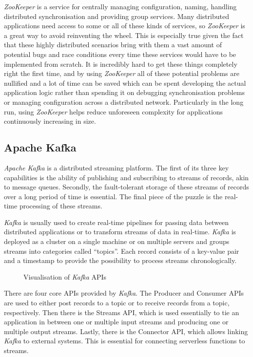 \textit{ZooKeeper} is a service for centrally managing configuration, naming, handling distributed
synchronisation and providing group services. Many distributed applications need access to some or
all of these kinds of services, so \textit{ZooKeeper} is a great way to avoid reinventing the wheel.
This is especially true given the fact that these highly distributed scenarios bring with them a
vast amount of potential bugs and race conditions every time these services would have to be
implemented from scratch. It is incredibly hard to get these things completely right the first time,
and by using \textit{ZooKeeper} all of these potential problems are nullified and a lot of time can
be saved which can be spent developing the actual application logic rather than spending it on
debugging synchronisation problems or managing configuration across a distributed network.
Particularly in the long run, using \textit{ZooKeeper} helps reduce unforeseen complexity for
applications continuously increasing in size.
\cite{zookeeper-homepage}

\subsection{Apache Kafka}

\textit{Apache Kafka} is a distributed streaming platform. The first of its three key capabilities
is the ability of publishing and subscribing to streams of records, akin to message queues.
Secondly, the fault-tolerant storage of these streams of records over a long period of time is
essential. The final piece of the puzzle is the real-time processing of these streams.

\textit{Kafka} is usually used to create real-time pipelines for passing data between distributed
applications or to transform streams of data in real-time. \textit{Kafka} is deployed as a cluster
on a single machine or on multiple servers and groups streams into categories called “topics”. Each
record consists of a key-value pair and a timestamp to provide the possibility to process streams
chronologically.

\begin{figure}[H]
  \centering
  \caption{Visualisation of \textit{Kafka} APIs \cite{kafka-complete-introduction}}
\end{figure}

There are four core APIs provided by \textit{Kafka}. The Producer and Consumer APIs are used to
either post records to a topic or to receive records from a topic, respectively. Then there is the
Streams API, which is used essentially to tie an application in between one or multiple input
streams and producing one or multiple output streams. Lastly, there is the Connector API, which
allows linking \textit{Kafka} to external systems. This is essential for connecting serverless
functions to streams.
\cite{kafka-introduction}

